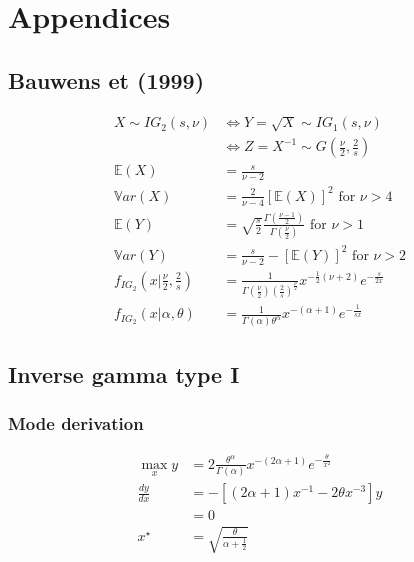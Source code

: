 \documentclass{article}
\begin{document}
\section*{Appendices}
\subsection*{Bauwens et (1999)}

\begin{align*}
X \sim IG_2(s, \nu) &\Leftrightarrow Y = \sqrt{X} \sim IG_1(s, \nu)\\
& \Leftrightarrow Z = X^{-1} \sim G(\frac{\nu}{2}, \frac{2}{s})\\
\mathbb{E}(X) &= \frac{s}{\nu - 2}\\
\mathbb{V}ar(X) &= \frac{2}{\nu - 4}[\mathbb{E}(X)]^2 \mbox{ for }\nu > 4\\
\mathbb{E}(Y) &= \sqrt{\frac{s}{2}}\frac{\Gamma\left(\frac{\nu
-1}{2}\right)}{\Gamma\left(\frac{\nu}{2}\right)} \mbox{ for }\nu > 1 \\
\mathbb{V}ar(Y) &= \frac{s}{\nu - 2} - [\mathbb{E}(Y)]^2 \mbox{ for }\nu > 2\\
f_{IG_2}(x|\frac{\nu}{2}, \frac{2}{s}) &= \frac{1}{\Gamma(\frac{\nu}{2})\left(\frac{2}{s}\right)^{\frac{\nu}{2}}}x^{-\frac{1}{2}(\nu+2)}e^{-\frac{s}{2x}}    \\
f_{IG_2}(x|\alpha,\theta) &=
                                  \frac{1}{\Gamma(\alpha)\theta^\alpha}
                                  x^{-(\alpha+1)}e^{-\frac{1}{sx}}    
\end{align*}

\subsection*{Inverse gamma type I}
\subsubsection*{Mode derivation}
\begin{align*}
  \max_x y &=
             2\frac{\theta^\alpha}{\Gamma(\alpha)}x^{-(2\alpha+1)}e^{-\frac{\theta}{x^2}}\\
  \frac{dy}{dx} &= -\left[(2\alpha+1)x^{-1}-2\theta x^{-3}\right]y\\
           &= 0\\
  x^\star &= \sqrt{\frac{\theta}{\alpha + \frac{1}{2}}}
\end{align*}
\end{document}
